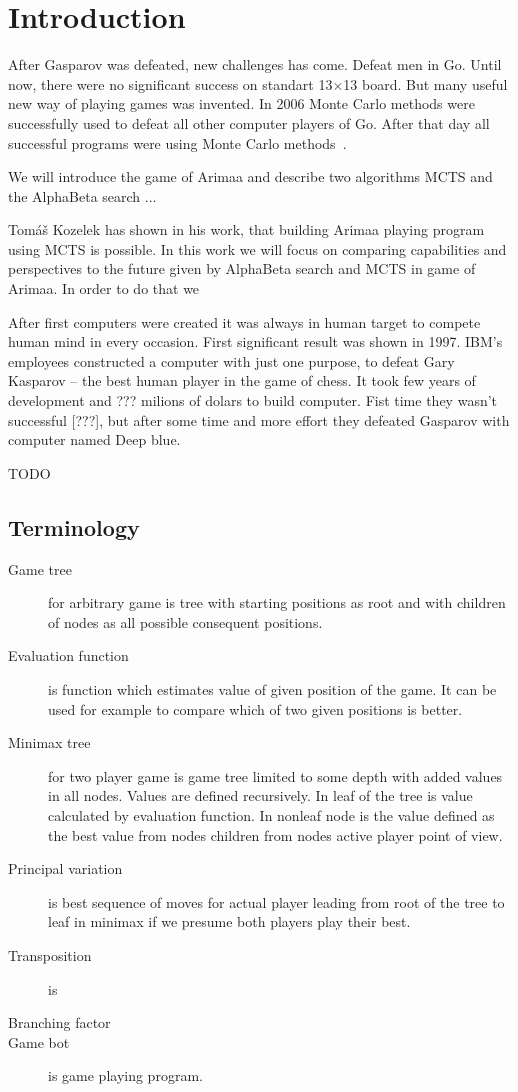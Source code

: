 \chapter{Introduction}
After Gasparov was defeated, new challenges has come. Defeat men in Go. Until
now, there were no significant success on standart 13$\times$13 board. But many
useful new way of playing games was invented. In 2006 Monte Carlo methods were
successfully used to defeat all other computer players of Go. After that day
all successful programs were using Monte Carlo methods~\cite{MoGo}.

We will introduce the game of Arimaa and describe two algorithms \ac{MCTS} and the AlphaBeta search ... 


Tomáš Kozelek has shown in his work, that building Arimaa playing program using
MCTS is possible. In this work we will focus on comparing capabilities and
perspectives to the future given by AlphaBeta search and MCTS in game of
Arimaa. In order to do that we 

After first computers were created it was always in human target to compete
human mind in every occasion. First significant result was shown in 1997. IBM's
employees constructed a computer with just one purpose, to defeat Gary Kasparov
-- the best human player in the game of chess. It took few years of development
and ??? milions of dolars to build computer. Fist time they wasn't successful
[???], but after some time and more effort they defeated Gasparov with computer
named Deep blue.
\cite{arimaa.com}

TODO

\section{Terminology}
\begin{description}
\item[Game tree] for arbitrary game is tree with starting positions as root and
   with children of nodes as all possible consequent positions.
\item[Evaluation function] is function which estimates value of given position of the game. It can be used for example to compare which of two given positions is better.
\item[Minimax tree] for two player game is game tree limited to some depth with
added values in all nodes. Values are defined recursively. In leaf of the tree
is value calculated by evaluation function. In nonleaf node is the value
defined as the best value from nodes children from nodes active player point
of view.
\item[Principal variation] is best sequence of moves for actual player leading
from root of the tree to leaf in minimax if we presume both players play their
best.
\item[Transposition] is 
\item[Branching factor] 
\item[Game bot] is game playing program.
\end{description}

